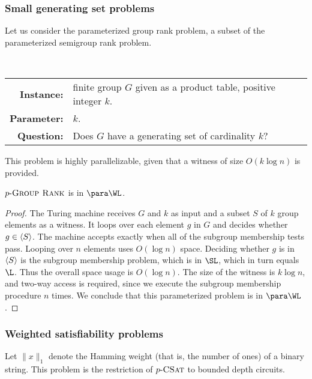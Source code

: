 \subsubsection{Small generating set problems}

Let us consider the parameterized group rank problem, a subset of the parameterized semigroup rank problem.

\begin{definition}[$\pgrouprank$]
  \mbox{} \\
  \begin{tabular}{r p{9.2cm}}
    \textbf{Instance:} & finite group $G$ given as a product table, positive integer $k$. \\
    \textbf{Parameter:} & $k$. \\
    \textbf{Question:} & Does $G$ have a generating set of cardinality $k$?
  \end{tabular}
\end{definition}

This problem is highly parallelizable, given that a witness of size $O(k \log n)$ is provided.

\begin{theorem}\label{thm:pgrouprank}
  $\pgrouprank$ is in $\para \WL$.
\end{theorem}
\begin{proof}
  The Turing machine receives $G$ and $k$ as input and a subset $S$ of $k$ group elements as a witness.
  It loops over each element $g$ in $G$ and decides whether $g \in \langle S\rangle$.
  The machine accepts exactly when all of the subgroup membership tests pass.
  Looping over $n$ elements uses $O(\log n)$ space.
  Deciding whether $g$ is in $\langle S\rangle$ is the subgroup membership problem, which is in $\SL$, which in turn equals $\L$.
  Thus the overall space usage is $O(\log n)$.
  The size of the witness is $k \log n$, and two-way access is required, since we execute the subgroup membership procedure $n$ times.
  We conclude that this parameterized problem is in $\para \WL$.
\end{proof}

\subsubsection{Weighted satisfiability problems}

Let $\|x\|_1$ denote the Hamming weight (that is, the number of ones) of a binary string.
This problem is the restriction of $p \textnormal{-} \textsc{CSat}$ to bounded depth circuits.

